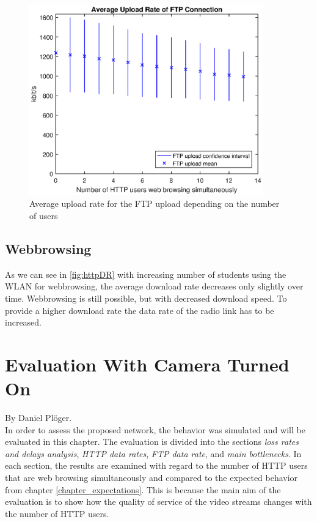 \documentclass[a4paper,10pt]{book}\usepackage{graphicx}
\begin{document}
\begin{figure}[!ht]
  \begin{center}
    \includegraphics[width=0.9\textwidth]{off_ftp_upload.eps}
    \caption{Average upload rate for the FTP upload depending on the number of users}
    \label{fig:ftpUpR}
  \end{center}
\end{figure}

\section{Webbrowsing}
As we can see in \ref{fig:httpDR} with increasing number of students using the WLAN for webbrowsing, the average download rate decreases only slightly over time. Webbrowsing is still possible, but with decreased download speed.
To provide a higher download rate the data rate of the radio link has to be increased. 

\chapter{Evaluation With Camera Turned On}
By Daniel Plöger.\\

In order to assess the proposed network, the behavior was simulated and will be evaluated in this chapter. The evaluation is divided into the sections \textit{loss rates and delays analysis}, \textit{HTTP data rates}, \textit{FTP data rate}, and \textit{main bottlenecks}. In each section, the results are examined with regard to the number of HTTP users that are web browsing simultaneously and compared to the expected behavior from chapter \ref{chapter_expectations}. This is because the main aim of the evaluation is to show how the quality of service of the video streams changes with the number of HTTP users. 
\end{document}
